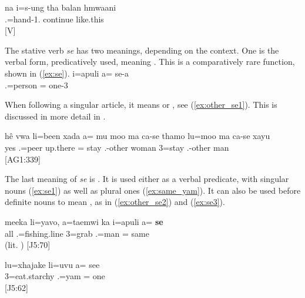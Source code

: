\ea \label{ex:balan}
\gll na i=s-ung tha balan hmwaani\\ 
  .=hand-1.  continue like.this\\ 
\glt {} {[V]}
\z

\label{ssec:se-me}

The stative verb \textit{se}  has two meanings, depending on the context. One is the verbal form, predicatively used, meaning . This is a comparatively rare function, shown in (\ref{ex:se}).
\ea \label{ex:se}
\gll i=apuli a= se-a\\ 
 .=person = one-3\\ 
\glt {}
\z

When following a singular article, it means  or , see (\ref{ex:other_se1}). This is discussed in more detail in .

\ea \label{ex:other_se1}
\gll hê vwa li=been xada a= mu moo ma ca-se thamo lu=moo ma ca-se xayu\\ 
 yes  .=peer up.there =  stay  .-other woman 3=stay  .-other man\\ 
\glt {} {[AG1:339]}
\z

The last meaning of \textit{se} is . It is used either as a verbal predicate, with singular nouns (\ref{ex:se1}) as well as plural ones (\ref{ex:same_yam}). It can also be used before definite nouns to mean , as in (\ref{ex:other_se2}) and (\ref{ex:se3}). 


\ea\label{ex:se1}
\gll meeka li=yavo, a=taemwi ka i=apuli a= \textbf{se}\\ 
 all .=fishing.line 3=grab  .=man = same \\ 
\glt {} (lit. ) {[J5:70]}
\z


\ea\label{ex:same_yam}
\gll lu=xhajake li=uvu a= see\\ 
 3=eat.starchy .=yam = one\\ 
\glt {} {[J5:62]}
\z


